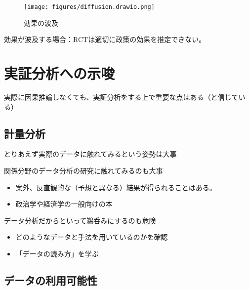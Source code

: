 \documentclass[
  xelatex,
  ja=standard]{bxjsarticle}
\providecommand{\tightlist}{%
  \setlength{\itemsep}{0pt}\setlength{\parskip}{0pt}}\usepackage{longtable,booktabs,array}
\begin{document}
\begin{figure}[htpb]

{\centering \texttt{[image: figures/diffusion.drawio.png]}

}

\caption{効果の波及}

\end{figure}

効果が波及する場合：RCTは適切に政策の効果を推定できない。

\hypertarget{ux5b9fux8a3cux5206ux6790ux3078ux306eux793aux5506}{%
\section{実証分析への示唆}\label{ux5b9fux8a3cux5206ux6790ux3078ux306eux793aux5506}}

実際に因果推論しなくても、実証分析をする上で重要な点はある（と信じている）

\hypertarget{ux8a08ux91cfux5206ux6790}{%
\subsection{計量分析}\label{ux8a08ux91cfux5206ux6790}}

とりあえず実際のデータに触れてみるという姿勢は大事

関係分野のデータ分析の研究に触れてみるのも大事

\begin{itemize}
\tightlist
\item
  案外、反直観的な（予想と異なる）結果が得られることはある。
\item
  政治学や経済学の一般向けの本\citep{banerjee2020, kitamura2020}
\end{itemize}

データ分析だからといって鵜呑みにするのも危険

\begin{itemize}
\tightlist
\item
  どのようなデータと手法を用いているのかを確認
\item
  「データの読み方」を学ぶ\citep{sugawara2022, ogiwara2023, tsutsui2023}
\end{itemize}

\hypertarget{ux30c7ux30fcux30bfux306eux5229ux7528ux53efux80fdux6027}{%
\subsection{データの利用可能性}\label{ux30c7ux30fcux30bfux306eux5229ux7528ux53efux80fdux6027}}
\end{document}
